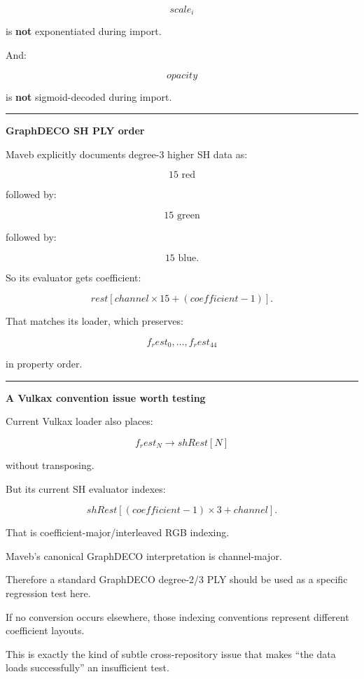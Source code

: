 \[
scale_i
\]

is \textbf{not} exponentiated during import.

And:

\[
opacity
\]

is \textbf{not} sigmoid-decoded during import.

\begin{center}\rule{0.5\linewidth}{0.5pt}\end{center}

\textbf{GraphDECO SH PLY order}

Maveb explicitly documents degree-3 higher SH data as:

\[
15\text{ red}
\]

followed by:

\[
15\text{ green}
\]

followed by:

\[
15\text{ blue}.
\]

So its evaluator gets coefficient:

\[
\boxed{
rest[
channel\times15
+
(coefficient-1)
].
}
\]

That matches its loader, which preserves:

\[
f_rest_0,\dots,f_rest_{44}
\]

in property order.

\begin{center}\rule{0.5\linewidth}{0.5pt}\end{center}

\textbf{A Vulkax convention issue worth testing}

Current Vulkax loader also places:

\[
f_rest_N
\rightarrow
shRest[N]
\]

without transposing.

But its current SH evaluator indexes:

\[
shRest[
(coefficient-1)\times3
+
channel
].
\]

That is coefficient-major/interleaved RGB indexing.

Maveb's canonical GraphDECO interpretation is channel-major.

Therefore a standard GraphDECO degree-2/3 PLY should be used as a specific regression test here.

If no conversion occurs elsewhere, those indexing conventions represent different coefficient layouts.

This is exactly the kind of subtle cross-repository issue that makes ``the data loads successfully'' an insufficient test.

